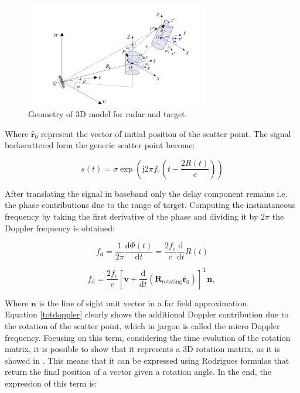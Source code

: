 \begin{figure}[h!]
    \centering
    \includegraphics[width=8cm]{Time-frequency analysis-chap3/img/3D model.png}
    \caption{Geometry of 3D model for radar and target.}
    \label{3dmodel}
\end{figure}

Where $\widehat{\boldsymbol{r}}_{0}$ represent the vector of initial position of the scatter point.
The signal backscattered form the generic scatter point become:

\begin{equation}
s(t)=\sigma \exp \left(\mathrm{j} 2 \pi f_{\mathrm{c}}\left(t-\frac{2 R(t)}{c}\right)\right)
\end{equation}

After translating the signal in baseband only the delay component remains i.e. the phase contributions due to the range of target. Computing the instantaneous frequency by taking the first derivative of the phase and dividing it by $2\pi$ the Doppler frequency is obtained:

\begin{equation}
f_{\mathrm{d}}=\frac{1}{2 \pi} \frac{\mathrm{d} \Phi(t)}{\mathrm{d} t}=\frac{2 f_{\mathrm{c}}}{c} \frac{\mathrm{d}}{\mathrm{d} t} R(t)
\end{equation}

\begin{equation}
f_{\mathrm{d}}=\frac{2 f_{\mathrm{c}}}{c}\left[\boldsymbol{v}+\frac{\mathrm{d}}{\mathrm{d} t}\left(\mathbf{R}_{\mathrm{rotating}} \overline{\boldsymbol{r}}_{0}\right)\right]^{\mathrm{T}} \boldsymbol{n} \text {, }
\label{totdoppler}
\end{equation}

Where $\textbf{n}$ is the line of sight unit vector in a far field approximation.\\
Equation \ref{totdoppler} clearly shows the additional Doppler contribution due to the rotation of the scatter point, which in jargon is called the micro Doppler frequency. 
Focusing on this term, considering the time evolution of the rotation matrix, it is possible to show that it represents a 3D rotation matrix, as it is showed in \cite{microdoppler_chen}. This means that it can be expressed using Rodrigues formulas that return the final position of a vector given a rotation angle. In the end, the expression of this term is:

